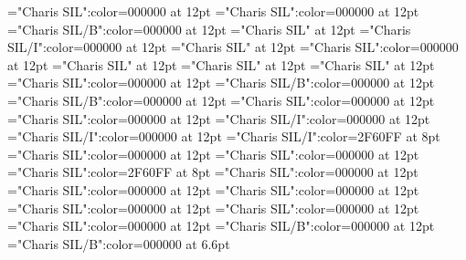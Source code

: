 \documentclass[a4paper]{article}
\begin{document}
\pagestyle{plain}
\sloppy
\setlength{\parfillskip}{0pt plus 1fil}
\font\xitemtpi="Charis SIL":color=000000 at 12pt
\font\xitembzhfonipa="Charis SIL":color=000000 at 12pt
\font\xitemxitemheadwordbefore="Charis SIL/B":color=000000 at 12pt
\font\xitemxitemexamplesbefore="Charis SIL" at 12pt
\font\xitemxitemexamplebefore="Charis SIL/I":color=000000 at 12pt
\font\xitemxitemslotsbefore="Charis SIL" at 12pt
\font\entrydicBody="Charis SIL":color=000000 at 12pt
\font{}="Charis SIL" at 12pt
\font{}="Charis SIL" at 12pt
\font{}="Charis SIL" at 12pt
\font\entryletDatadicBody="Charis SIL":color=000000 at 12pt
\font\headwordbzhentryletDatadicBody="Charis SIL/B":color=000000 at 12pt
\font\headwordafterentryletDatadicBody="Charis SIL/B":color=000000 at 12pt
\font\examplesentryletDatadicBody="Charis SIL":color=000000 at 12pt
\font\examplesafterentryletDatadicBody="Charis SIL":color=000000 at 12pt
\font\examplebzhexamplesentryletDatadicBody="Charis SIL/I":color=000000 at 12pt
\font\exampleafterexamplesentryletDatadicBody="Charis SIL/I":color=000000 at 12pt
\font\xlanguagetagenexamplebzhexamplesentryletDatadicBody="Charis SIL/I":color=2F60FF at 8pt
\font\translationsexamplesentryletDatadicBody="Charis SIL":color=000000 at 12pt
\font\translationentranslationsexamplesentryletDatadicBody="Charis SIL":color=000000 at 12pt
\font\xlanguagetagentranslationentranslationsexamplesentryletDatadicBody="Charis SIL":color=2F60FF at 8pt
\font\relationstranslationsexamplesentryletDatadicBody="Charis SIL":color=000000 at 12pt
\font\xitemrelationstranslationsexamplesentryletDatadicBody="Charis SIL":color=000000 at 12pt
\font\lexreftypeenxitemrelationstranslationsexamplesentryletDatadicBody="Charis SIL":color=000000 at 12pt
\font\lexreftargetsxitemrelationstranslationsexamplesentryletDatadicBody="Charis SIL":color=000000 at 12pt
\font\xitemlexreftargetsxitemrelationstranslationsexamplesentryletDatadicBody="Charis SIL":color=000000 at 12pt
\font\sensecrossrefbzhxitemlexreftargetsxitemrelationstranslationsexamplesentryletDatadicBody="Charis SIL":color=000000 at 12pt
\font\xsensenumberensensecrossrefbzhxitemlexreftargetsxitemrelationstranslationsexamplesentryletDatadicBody="Charis SIL/B":color=000000 at 12pt
\font\xhomographnumberbzhsensecrossrefbzhxitemlexreftargetsxitemrelationstranslationsexamplesentryletDatadicBody="Charis SIL/B":color=000000 at 6.6pt

\newpage 
\thispagestyle{empty} 
\mbox{} 
\newpage 
\newpage 
\setcounter{page}{1} 
\pagestyle{fancy} 
\end{document}
